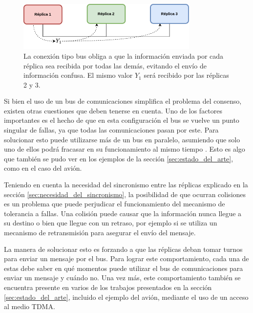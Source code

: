 \begin{figure}[htb]
    \centering
    \includegraphics[width=0.8\textwidth]{img/TMR_bus.png}
    \caption{La conexión tipo bus obliga a que la información enviada por cada réplica sea recibida por todas las demás, evitando el envío de información confusa. El mismo valor $Y_1$ será recibido por las réplicas 2 y 3.}
    \label{fig:TMR_bus}    
\end{figure}


Si bien el uso de un bus de comunicaciones simplifica el problema del consenso, existen otras cuestiones que deben tenerse en cuenta. Uno de los factores importantes es el hecho de que en esta configuración el bus se vuelve un punto singular de fallas, ya que todas las comunicaciones pasan por este. Para solucionar esto puede utilizarse más de un bus en paralelo, asumiendo que solo uno de ellos podrá fracasar en su funcionamiento al mismo tiempo \cite[p.~157]{kopetz-2011}. Esto es algo que también se pudo ver en los ejemplos de la sección \ref{sec:estado_del_arte}, como en el caso del avión.

Teniendo en cuenta la necesidad del sincronismo entre las réplicas explicado en la sección \ref{sec:necesidad_del_sincronismo}, la posibilidad de que ocurran colisiones es un problema que puede perjudicar el funcionamiento del mecanismo de tolerancia a fallas. Una colisión puede causar que la información nunca llegue a su destino o bien que llegue con un retraso, por ejemplo si se utiliza un mecanismo de retransmisión para asegurar el envío del mensaje.

La manera de solucionar esto es forzando a que las réplicas deban tomar turnos para enviar un mensaje por el bus. Para lograr este comportamiento, cada una de estas debe saber en qué momentos puede utilizar el bus de comunicaciones para enviar un mensaje y cuándo no. Una vez más, este comportamiento también se encuentra presente en varios de los trabajos presentados en la sección \ref{sec:estado_del_arte}, incluido el ejemplo del avión, mediante el uso de un acceso al medio TDMA.

